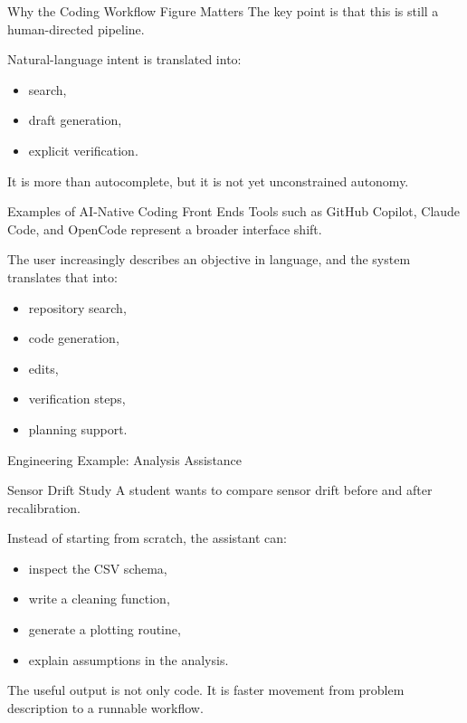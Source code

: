 \documentclass[12pt]{beamer}
\begin{document}
\begin{frame}{Why the Coding Workflow Figure Matters}
  The key point is that this is still a human-directed pipeline.

  Natural-language intent is translated into:
  \begin{itemize}
    \item search,
    \item draft generation,
    \item explicit verification.
  \end{itemize}

  It is more than autocomplete, but it is not yet unconstrained autonomy.
\end{frame}

\begin{frame}{Examples of AI-Native Coding Front Ends}
  Tools such as GitHub Copilot, Claude Code, and OpenCode represent a broader interface shift.

  The user increasingly describes an objective in language, and the system translates that into:
  \begin{itemize}
    \item repository search,
    \item code generation,
    \item edits,
    \item verification steps,
    \item planning support.
  \end{itemize}
\end{frame}

\begin{frame}{Engineering Example: Analysis Assistance}
  \begin{examplebox}{Sensor Drift Study}
    A student wants to compare sensor drift before and after recalibration.
  \end{examplebox}

  Instead of starting from scratch, the assistant can:
  \begin{itemize}
    \item inspect the CSV schema,
    \item write a cleaning function,
    \item generate a plotting routine,
    \item explain assumptions in the analysis.
  \end{itemize}

  The useful output is not only code. It is faster movement from problem description to a runnable workflow.
\end{frame}
\end{document}
